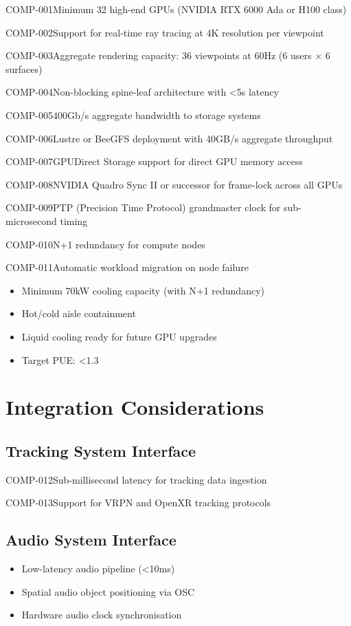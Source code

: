 \begin{requirement}{COMP-001}{Minimum 32 high-end GPUs (NVIDIA RTX 6000 Ada or H100 class)}
\begin{requirement}{COMP-002}{Support for real-time ray tracing at 4K resolution per viewpoint}
\begin{requirement}{COMP-003}{Aggregate rendering capacity: 36 viewpoints at 60Hz (6 users × 6 surfaces)}
\begin{requirement}{COMP-004}{Non-blocking spine-leaf architecture with <5\textmu s latency}
\begin{requirement}{COMP-005}{400Gb/s aggregate bandwidth to storage systems}
\begin{requirement}{COMP-006}{Lustre or BeeGFS deployment with 40GB/s aggregate throughput}
\begin{requirement}{COMP-007}{GPUDirect Storage support for direct GPU memory access}
\begin{requirement}{COMP-008}{NVIDIA Quadro Sync II or successor for frame-lock across all GPUs}
\begin{requirement}{COMP-009}{PTP (Precision Time Protocol) grandmaster clock for sub-microsecond timing}
\begin{requirement}{COMP-010}{N+1 redundancy for compute nodes}
\begin{requirement}{COMP-011}{Automatic workload migration on node failure}
\begin{itemize}
    \item Minimum 70kW cooling capacity (with N+1 redundancy)
    \item Hot/cold aisle containment
    \item Liquid cooling ready for future GPU upgrades
    \item Target PUE: <1.3
\end{itemize}

\section{Integration Considerations}

\subsection{Tracking System Interface}

\begin{requirement}{COMP-012}{Sub-millisecond latency for tracking data ingestion}

\begin{requirement}{COMP-013}{Support for VRPN and OpenXR tracking protocols}

\subsection{Audio System Interface}

\begin{itemize}
    \item Low-latency audio pipeline (<10ms)
    \item Spatial audio object positioning via OSC
    \item Hardware audio clock synchronisation
\end{itemize}


\end{requirement}
\end{requirement}
\end{requirement}
\end{requirement}
\end{requirement}
\end{requirement}
\end{requirement}
\end{requirement}
\end{requirement}
\end{requirement}
\end{requirement}
\end{requirement}
\end{requirement}
